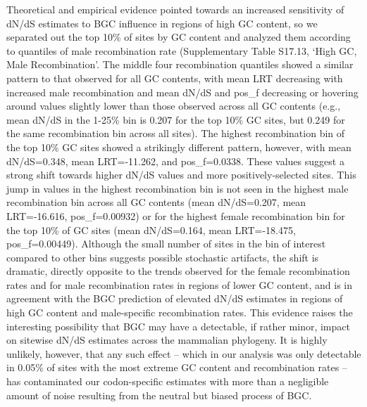 Theoretical and empirical evidence pointed towards an increased
sensitivity of dN/dS estimates to BGC influence in regions of high GC
content, so we separated out the top 10\% of sites by GC content and
analyzed them according to quantiles of male recombination rate
(Supplementary Table S17.13, ‘High GC, Male Recombination’. The middle
four recombination quantiles showed a similar pattern to that observed
for all GC contents, with mean LRT decreasing with increased male
recombination and mean dN/dS and pos\_f decreasing or hovering around
values slightly lower than those observed across all GC contents
(e.g., mean dN/dS in the 1-25\% bin is 0.207 for the top 10\% GC
sites, but 0.249 for the same recombination bin across all sites). The
highest recombination bin of the top 10\% GC sites showed a strikingly
different pattern, however, with mean dN/dS=0.348, mean LRT=-11.262,
and pos\_f=0.0338. These values suggest a strong shift towards higher
dN/dS values and more positively-selected sites. This jump in values
in the highest recombination bin is not seen in the highest male
recombination bin across all GC contents (mean dN/dS=0.207, mean
LRT=-16.616, pos\_f=0.00932) or for the highest female recombination
bin for the top 10\% of GC sites (mean dN/dS=0.164, mean LRT=-18.475,
pos\_f=0.00449). Although the small number of sites in the bin of
interest compared to other bins suggests possible stochastic
artifacts, the shift is dramatic, directly opposite to the trends
observed for the female recombination rates and for male recombination
rates in regions of lower GC content, and is in agreement with the BGC
prediction of elevated dN/dS estimates in regions of high GC content
and male-specific recombination rates. This evidence raises the
interesting possibility that BGC may have a detectable, if rather
minor, impact on sitewise dN/dS estimates across the mammalian
phylogeny. It is highly unlikely, however, that any such effect --
which in our analysis was only detectable in 0.05\% of sites with the
most extreme GC content and recombination rates -- has contaminated
our codon-specific estimates with more than a negligible amount of
noise resulting from the neutral but biased process of BGC.


